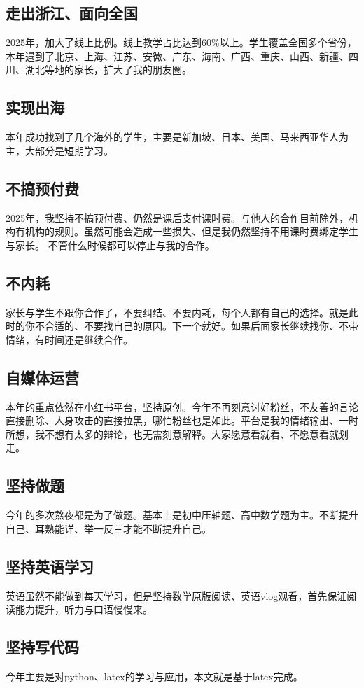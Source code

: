 \documentclass[11pt,a4paper]{article}
\begin{document}
\subsection{走出浙江、面向全国}
2025年，加大了线上比例。线上教学占比达到60\%以上。学生覆盖全国多个省份，本年遇到了北京、上海、江苏、安徽、广东、海南、广西、重庆、山西、新疆、四川、湖北等地的家长，扩大了我的朋友圈。
\subsection{实现出海}
本年成功找到了几个海外的学生，主要是新加坡、日本、美国、马来西亚华人为主，大部分是短期学习。
\subsection{不搞预付费}
2025年，我坚持不搞预付费、仍然是课后支付课时费。与他人的合作目前除外，机构有机构的规则。虽然可能会造成一些损失、但是我仍然坚持不用课时费绑定学生与家长。
不管什么时候都可以停止与我的合作。
\subsection{不内耗}
家长与学生不跟你合作了，不要纠结、不要内耗，每个人都有自己的选择。就是此时的你不合适的、不要找自己的原因。下一个就好。如果后面家长继续找你、不带情绪，有时间还是继续合作。
\subsection{自媒体运营}
本年的重点依然在小红书平台，坚持原创。今年不再刻意讨好粉丝，不友善的言论直接删除、人身攻击的直接拉黑，哪怕粉丝也是如此。平台是我的情绪输出、一时所想，我不想有太多的辩论，也无需刻意解释。大家愿意看就看、不愿意看就划走。
\subsection{坚持做题}
今年的多次熬夜都是为了做题。基本上是初中压轴题、高中数学题为主。不断提升自己、耳熟能详、举一反三才能不断提升自己。
\subsection{坚持英语学习}
英语虽然不能做到每天学习，但是坚持数学原版阅读、英语vlog观看，首先保证阅读能力提升，听力与口语慢慢来。
\subsection{坚持写代码}
今年主要是对python、latex的学习与应用，本文就是基于latex完成。
\end{document}

